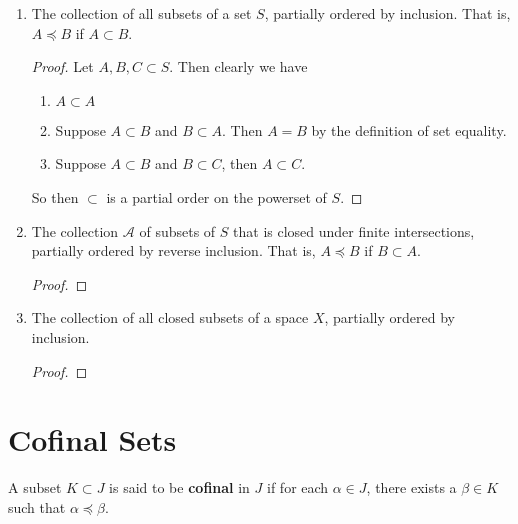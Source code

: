 \documentclass[12pt]{article}
\begin{document}
\begin{enumerate}
\begin{proof}
\begin{enumerate}
                        let $a, b \in A$. We wish to show that there exists a $c \in A$ with $a \leq c$ and $b \leq c$.

                        $A$ is simply ordered, so either $a < b$ or $b < a$. Without loss of generality, let $a < b$. But from (\ref{pf:part-order}) $A$ is partially ordered by $\leq$, so we have $b \leq b$!
              \end{enumerate}
              Then $\leq$ is a partial ordering on $A$ and for every pair $a, b \in A$ we have either $a \leq b$ and $b \leq b$, or we have $b \leq a$ and $a \leq a$! Thus $A$ is directed.
          \end{proof}

    \item The collection of all subsets of a set $S$, partially ordered by inclusion. That is, $A \preceq B$ if $A \subset B$.
          \begin{proof}
            Let $A, B, C \subset S$. Then clearly we have
            \begin{enumerate}
                \item $A \subset A$
                \item Suppose $A \subset B$ and $B \subset A$. Then $A = B$ by the definition of set equality.
                \item Suppose $A \subset B$ and $B \subset C$, then $A \subset C$.
            \end{enumerate}
            So then $\subset$ is a partial order on the powerset of $S$.
          \end{proof}

    \item The collection $\mathcal A$ of subsets of $S$ that is closed under finite intersections, partially ordered by reverse inclusion. That is, $A \preceq B$ if $B \subset A$.
          \begin{proof}
          \end{proof}

    \item The collection of all closed subsets of a space $X$, partially ordered by inclusion.
          \begin{proof}
          \end{proof}
\end{enumerate}

\section{Cofinal Sets}
\begin{defn}
    A subset $K \subset J$ is said to be \textbf{cofinal} in $J$ if for each $\alpha \in J$, there exists a $\beta \in K$ such that $\alpha \preceq \beta$.
\end{defn}
\end{document}

